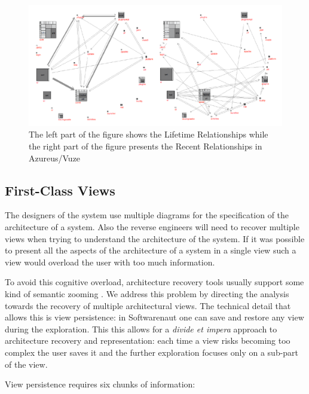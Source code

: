 \documentclass[preprint,12pt]{elsarticle}
\begin{document}
\begin{figure}[h]
\begin{center}
\includegraphics[width=\linewidth]{Architecture-LifetimeVsRecent}
\caption{The left part of the figure shows the Lifetime Relationships while the right part of the figure presents the Recent Relationships in Azureus/Vuze}
\end{center}
\end{figure}






\newpage
\subsection {First-Class Views}

The designers of the system use multiple diagrams for the specification of the architecture of a system. Also the reverse engineers will need to recover multiple views when trying to understand the architecture of the system. If it was possible to present all the aspects of the architecture of a system in a single view such a view would overload the user with too much information.

To avoid this cognitive overload, architecture recovery tools usually support some kind of semantic zooming \cite{storey-shrimp}. We address this problem by directing the analysis towards the recovery of multiple architectural views. The technical detail that allows this is view persistence: in Softwarenaut one can save and restore any view during the exploration. This this allows for a {\em divide et impera} approach to architecture recovery and representation: each time a view risks becoming too complex the user saves it and the further exploration focuses only on a sub-part of the view. 

View persistence requires six chunks of information:
\end{document}
